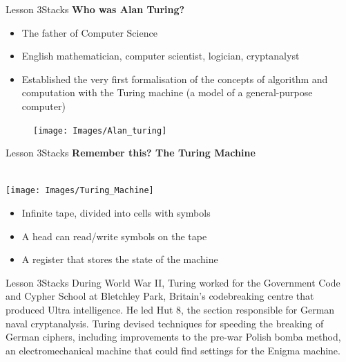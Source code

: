 \documentclass[aspectratio=1610]{beamer}
\begin{document}
\begin{frame}{Lesson 3}{Stacks}
{\LARGE\textbf{{Who was Alan Turing?}}}
\Large
\begin{minipage}{0.70\textwidth}
    \begin{itemize}
      \item The father of Computer Science
      \item English mathematician, computer scientist, logician, cryptanalyst
      \item Established the very first formalisation of the concepts of algorithm and computation with the Turing machine (a model of a general-purpose computer)
     \end{itemize}
  \end{minipage}
\begin{minipage}{.0\textwidth}
      \begin{figure}
        \texttt{[image: Images/Alan\_turing]}
      \end{figure}
  \end{minipage}  
\end{frame}

\begin{frame}{Lesson 3}{Stacks}
{\LARGE\textbf{{Remember this? The Turing Machine}}}\\~\\
\begin{minipage}{0.57\textwidth}
\texttt{[image: Images/Turing\_Machine]}
\end{minipage}
\Large
\begin{minipage}{0.42\textwidth}
    \begin{itemize}
      \item Infinite tape, divided into cells with symbols
      \item A head can read/write symbols on the tape
      \item A register that stores the state of the machine
    \end{itemize}
  \end{minipage}
\end{frame}

\begin{frame}{Lesson 3}{Stacks}
\LARGE
During World War II, Turing worked for the Government Code and Cypher
School at Bletchley Park, Britain's codebreaking centre that produced
Ultra intelligence. He led Hut 8, the section responsible for German
naval cryptanalysis. Turing devised techniques for speeding the
breaking of German ciphers, including improvements to the pre-war
Polish bomba method, an electromechanical machine that could find
settings for the Enigma machine. 
\end{frame}
\end{document}
